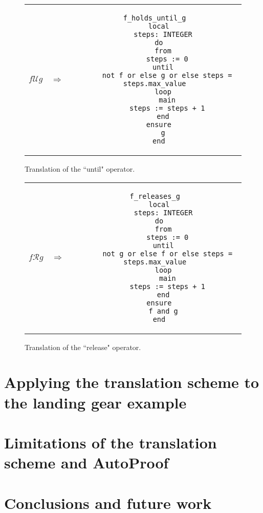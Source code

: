 \begin{figure}
\begin{tabular}{c c c}
$f \mathcal{U} g$
&
$\Longrightarrow$
&
\begin{lstlisting}
f_holds_until_g
  local
    steps: INTEGER
  do
    from
      steps := 0
    until
      not f or else g or else steps = steps.max_value
    loop
      main
      steps := steps + 1
    end
  ensure
    g
  end
\end{lstlisting}
\end{tabular}
\caption{Translation of the ``until" operator.}
\label{fig:ltl_until_eiffel}
\end{figure}

\begin{figure}
\begin{tabular}{c c c}
$f \mathcal{R} g$
&
$\Longrightarrow$
&
\begin{lstlisting}
f_releases_g
  local
    steps: INTEGER
  do
    from
      steps := 0
    until
      not g or else f or else steps = steps.max_value
    loop
      main
      steps := steps + 1
    end
  ensure
    f and g
  end
\end{lstlisting}
\end{tabular}
\caption{Translation of the ``release" operator.}
\label{fig:ltl_release_eiffel}
\end{figure}


\section{Applying the translation scheme to the landing gear example}
\label{sec:applying_to_example}


\section{Limitations of the translation scheme and AutoProof}
\label{sec:limitations}



\section{Conclusions and future work}
\label{sec:conclusions}


{{{
	
	
}}}


